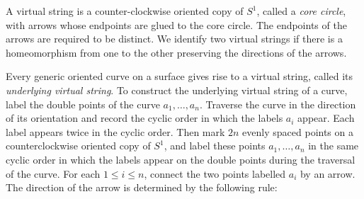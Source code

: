 A virtual string is a counter-clockwise oriented copy of $S^1$, called a {\it core circle}, with arrows whose endpoints are glued to the core circle.  The endpoints of the arrows are required to be distinct.  We identify two virtual strings if there is a homeomorphism from one to the other preserving the directions of the arrows.

Every generic oriented curve on a surface gives rise to a virtual string, called its {\it underlying virtual string}.  To construct the underlying virtual string of a curve, label the double points of the curve $a_1, \dots, a_n$.  Traverse the curve in the direction of its orientation and record the cyclic order in which the labels $a_i$ appear.  Each label appears twice in the cyclic order.  Then mark $2n$ evenly spaced points on a counterclockwise oriented copy of $S^1$, and label these points $a_1, \dots, a_n$ in the same cyclic order in which the labels appear on the double points during the traversal of the curve.  For each $1\leq i \leq n$, connect the two points labelled $a_i$ by an arrow.  The direction of the arrow is determined by the following rule: 


\begin{figure}[ht]
\centering
{}
\label{fig:subfigureExample}
\end{figure}
\begin{figure}[ht]
\centering
{}
\label{fig:subfigureExample}
\end{figure}

